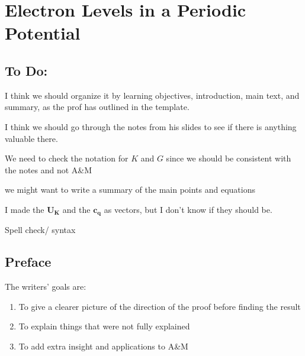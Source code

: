 \chapter{Electron Levels in a Periodic Potential}

\listoftodos

\section{To Do:}
	I think we should organize it by learning objectives, introduction, main text, and summary, as the prof has outlined in the template.

	I think we should go through the notes from his slides to see if there is anything valuable there.

	We need to check the notation for $K$ and $G$ since we should be consistent with the notes and not A\&M

	we might want to write a summary of the main points and equations

	I made the $\mathbf{U_K}$ and the $\mathbf{c_q}$ as vectors, but I don't know if they should be.

	Spell check/ syntax

\section{Preface}

	The writers' goals are:
	\begin{enumerate}
		\item To give a clearer picture of the direction of the proof before finding the result
		\item To explain things that were not fully explained
		\item To add extra insight and applications to A\&M
	\end{enumerate}


